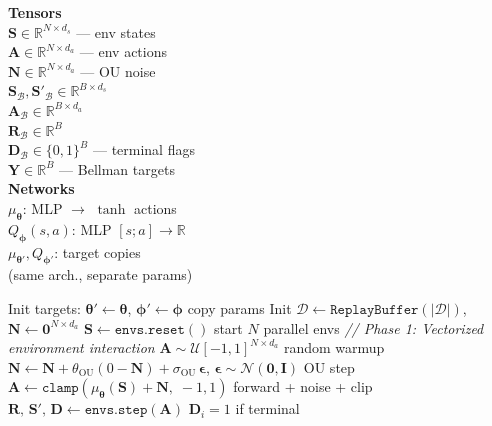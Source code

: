 \documentclass[11pt]{article}
\begin{document}
\begin{algorithm}[p]
\begin{minipage}[t]{0.28\linewidth}
\vspace{6pt}
\textbf{Tensors} \\[2pt]
$\mathbf{S} \in \mathbb{R}^{N \times d_s}$ --- env states \\
$\mathbf{A} \in \mathbb{R}^{N \times d_a}$ --- env actions \\
$\mathbf{N} \in \mathbb{R}^{N \times d_a}$ --- OU noise \\[3pt]
$\mathbf{S}_\mathcal{B}, \mathbf{S}'_\mathcal{B} \in \mathbb{R}^{B \times d_s}$ \\
$\mathbf{A}_\mathcal{B} \in \mathbb{R}^{B \times d_a}$ \\
$\mathbf{R}_\mathcal{B} \in \mathbb{R}^{B}$ \\
$\mathbf{D}_\mathcal{B} \in \{0,1\}^{B}$ --- terminal flags \\
$\mathbf{Y} \in \mathbb{R}^{B}$ --- Bellman targets \\[3pt]
\textbf{Networks} \\[2pt]
$\mu_{\boldsymbol{\theta}}$: MLP $\to$ $\tanh$ actions \\
$Q_{\boldsymbol{\phi}}(s,a)$: MLP $[s;a] \to \mathbb{R}$ \\
$\mu_{\boldsymbol{\theta}'}, Q_{\boldsymbol{\phi}'}$: target copies \\
\hspace*{1em}(same arch., separate params)
\end{minipage}%
\hfill
\vrule
\hfill
\begin{minipage}[t]{0.68\linewidth}
\begin{algorithmic}[1]
\State Init targets: $\boldsymbol{\theta}' \gets \boldsymbol{\theta}$, \; $\boldsymbol{\phi}' \gets \boldsymbol{\phi}$ \hfill copy params
\State Init $\mathcal{D} \gets \texttt{ReplayBuffer}(|\mathcal{D}|)$, \; $\mathbf{N} \gets \mathbf{0}^{N \times d_a}$
\State $\mathbf{S} \gets \texttt{envs.reset}()$ \hfill start $N$ parallel envs
    \Statex \hspace{\algorithmicindent}\textit{// Phase 1: Vectorized environment interaction}
        \State $\mathbf{A} \sim \mathcal{U}[-1, 1]^{N \times d_a}$ \hfill random warmup
    \Else
        \State $\mathbf{N} \gets \mathbf{N} + \theta_{\text{OU}}(0 - \mathbf{N}) + \sigma_{\text{OU}}\,\boldsymbol{\epsilon}$, \;\; $\boldsymbol{\epsilon} \sim \mathcal{N}(\mathbf{0}, \mathbf{I})$ \hfill OU step
        \State $\mathbf{A} \gets \texttt{clamp}(\mu_{\boldsymbol{\theta}}(\mathbf{S}) + \mathbf{N},\; {-}1, 1)$ \hfill forward + noise + clip
    \EndIf
    \State $\mathbf{R},\, \mathbf{S}',\, \mathbf{D} \gets \texttt{envs.step}(\mathbf{A})$ \hfill $\mathbf{D}_i = 1$ if terminal

\end{algorithmic}
\end{minipage}
\end{algorithm}
\end{document}
